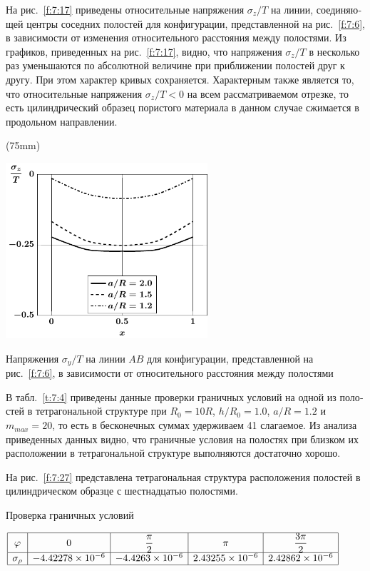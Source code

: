 \begin{russian}
На рис.~\ref{f:7:17} приведены относительные напряжения $\sigma_z/T$ на линии, соединяющей центры соседних полостей для конфигурации, представленной на рис.~\ref{f:7:6}, в зависимости от изменения относительного расстояния между полостями. Из графиков, приведенных на рис.~\ref{f:7:17}, видно, что напряжения $\sigma_z/T$ в несколько раз уменьшаются по абсолютной величине при приближении полостей друг к другу. При этом характер кривых сохраняется. Характерным также является то, что относительные напряжения $\sigma_z/T<0$ на всем рассматриваемом отрезке, то есть цилиндрический образец пористого материала в данном случае сжимается в продольном направлении.

\sidefig(75mm){
\includegraphics[width=7.5cm]{cav4_sig-z.pdf}
\caption{Напряжения $\sigma_y/T$ на линии $AB$ для конфигурации, представленной на рис.~\ref{f:7:6}, в зависимости от относительного расстояния между полостями}
\label{f:7:17}
}{В табл.~\ref{t:7:4} приведены данные проверки граничных условий на одной из полостей в тетрагональной структуре при $R_0=10R$, $h/R_0=1.0$, $a/R=1.2$ и $m_{max}=20$, то есть в бесконечных суммах удерживаем 41 слагаемое. Из анализа приведенных данных видно, что граничные условия на полостях при близком их расположении в тетрагональной структуре выполняются достаточно хорошо.

На рис.~\ref{f:7:27} представлена тетрагональная структура расположения полостей в цилиндрическом образце с шестнадцатью полостями.
}

\begin{table}[h!]
\caption{Проверка граничных условий}
\centering
$
\begin{array}{|c|c|c|c|c|}
\hline
\varphi & 0 & \dfrac{\pi}{2} & \pi & \dfrac{3\pi}{2} \\
\hline
\sigma_\rho & -4.42278\times10^{-6} & -4.4263\times10^{-6} & 2.43255\times 10^{-6} & 2.42862\times 10^{-6} \\
\hline
\end{array}
$
\label{t:7:4}
\end{table}


\end{russian}
